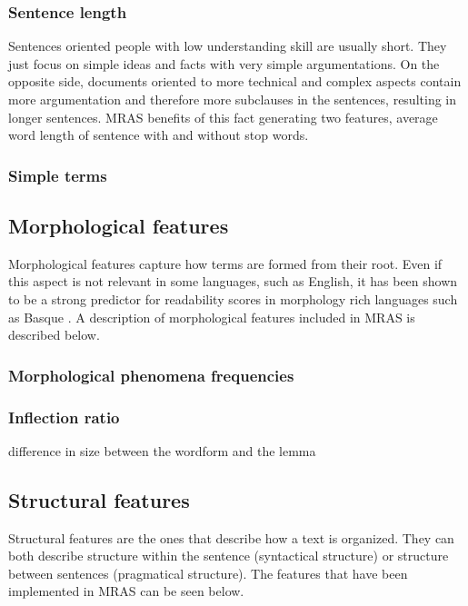 \documentclass{bsu-ms}
\newcommand{\projectName}{MRAS\xspace}
\begin{document}
\subsubsection*{Sentence length}
Sentences oriented people with low understanding skill are usually short. They just focus on simple ideas and facts with very simple argumentations. On the opposite side, documents oriented to more technical and complex aspects contain more argumentation and therefore more subclauses in the sentences, resulting in longer sentences. \projectName benefits of this fact generating two features, average word length of sentence with and without stop words.

\subsubsection*{Simple terms}







\subsection{Morphological features}
Morphological features capture how terms are formed from their root. Even if this  aspect is not relevant in some languages, such as English, it has been shown to be a strong predictor for readability scores in morphology rich languages such as Basque \cite{gonzalez2014simple}. A description of morphological features included in \projectName is described below.


\subsubsection*{Morphological phenomena frequencies}

\subsubsection*{Inflection ratio}
difference in size between the wordform and the lemma


\subsection{Structural features}
Structural features are the ones that describe how a text is organized. They can both describe structure within the sentence (syntactical structure) or structure between sentences (pragmatical structure). The features that have been implemented in \projectName can be seen below.
\end{document}
